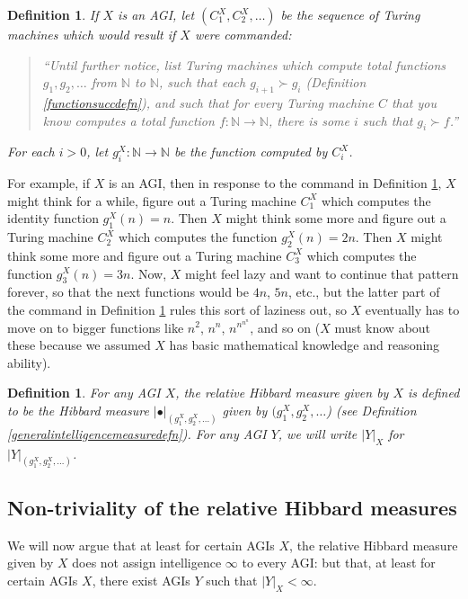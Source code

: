 \documentclass{article}
\newtheorem{definition}[theorem]{Definition}
\begin{document}
\begin{definition}
\label{functionlistdefinition}
    If $X$ is an AGI, let $(C^X_1, C^X_2, \ldots)$ be the sequence of
    Turing machines which would result if $X$ were commanded:
    \begin{quote}
        ``Until further notice, list Turing machines which compute total
        functions $g_1,g_2,\ldots$ from $\mathbb N$ to $\mathbb N$, such that
        each $g_{i+1}\succ g_i$ (Definition \ref{functionsuccdefn}),
        and such that for every Turing machine $C$ that you know computes
        a total function $f:\mathbb N\to\mathbb N$,
        there is some $i$ such that $g_i\succ f$.''
    \end{quote}
    For each $i>0$, let $g^X_i:\mathbb N\to\mathbb N$ be the function computed by
    $C^X_i$.
\end{definition}

For example, if $X$ is an AGI, then in response to the command in Definition
\ref{functionlistdefinition}, $X$ might think for a while, figure out a Turing
machine $C^X_1$ which computes the identity function $g^X_1(n)=n$. Then $X$
might think some more and figure out a Turing machine $C^X_2$ which computes
the function $g^X_2(n)=2n$. Then $X$ might think some more and figure
out a Turing machine $C^X_3$ which computes the function $g^X_3(n)=3n$.
Now, $X$ might feel lazy and want to continue that pattern forever, so that
the next functions would be $4n$, $5n$, etc., but the latter part of the command in
Definition \ref{functionlistdefinition} rules this sort of laziness out, so $X$
eventually has to move on to bigger functions like $n^2$, $n^n$,
$n^{n^{n^{n}}}$,
and so on ($X$ must know about these because we assumed $X$ has basic mathematical
knowledge and reasoning ability).

\begin{definition}
    For any AGI $X$, the \emph{relative Hibbard measure given by $X$}
    is defined to be the Hibbard measure
    $|\bullet|_{(g^X_1,g^X_2,\ldots)}$
    given by
    $(g^X_1,g^X_2,\ldots$) (see Definition \ref{generalintelligencemeasuredefn}).
    For any AGI $Y$, we will write $|Y|_X$ for $|Y|_{(g^X_1,g^X_2,\ldots)}$.
\end{definition}

\subsection{Non-triviality of the relative Hibbard measures}

We will now argue that at least for certain AGIs $X$,
the relative Hibbard measure given by $X$ does not assign intelligence $\infty$
to every AGI: but that, at least for certain AGIs $X$, there exist AGIs $Y$
such that $|Y|_X<\infty$.
\end{document}
